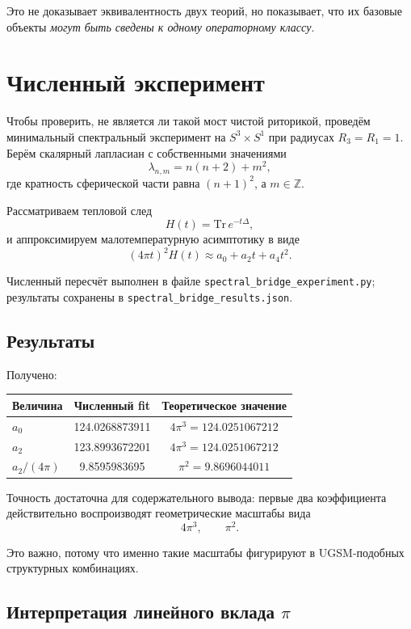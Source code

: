 \documentclass[12pt,a4paper]{article}
\begin{document}
Это не доказывает эквивалентность двух теорий, но показывает, что их базовые объекты \emph{могут быть сведены к одному операторному классу}.

\section{Численный эксперимент}

Чтобы проверить, не является ли такой мост чистой риторикой, проведём минимальный спектральный эксперимент на \(S^3 \times S^1\) при радиусах \(R_3 = R_1 = 1\). Берём скалярный лапласиан с собственными значениями
\[
\lambda_{n,m}=n(n+2)+m^2,
\]
где кратность сферической части равна \((n+1)^2\), а \(m\in\mathbb Z\).

Рассматриваем тепловой след
\[
H(t)=\mathrm{Tr}\, e^{-t\Delta},
\]
и аппроксимируем малотемпературную асимптотику в виде
\[
(4\pi t)^2 H(t) \approx a_0 + a_2 t + a_4 t^2.
\]

Численный пересчёт выполнен в файле \texttt{spectral\_bridge\_experiment.py}; результаты сохранены в \texttt{spectral\_bridge\_results.json}.

\subsection{Результаты}

Получено:
\begin{center}
\begin{tabular}{lcc}
\toprule
Величина & Численный fit & Теоретическое значение \\
\midrule
$a_0$ & 124.0268873911 & $4\pi^3 = 124.0251067212$ \\
$a_2$ & 123.8993672201 & $4\pi^3 = 124.0251067212$ \\
$a_2/(4\pi)$ & 9.8595983695 & $\pi^2 = 9.8696044011$ \\
\bottomrule
\end{tabular}
\end{center}

Точность достаточна для содержательного вывода: первые два коэффициента действительно воспроизводят геометрические масштабы вида
\[
4\pi^3, \qquad \pi^2.
\]

Это важно, потому что именно такие масштабы фигурируют в UGSM-подобных структурных комбинациях.

\subsection{Интерпретация линейного вклада \texorpdfstring{$\pi$}{pi}}
\end{document}
